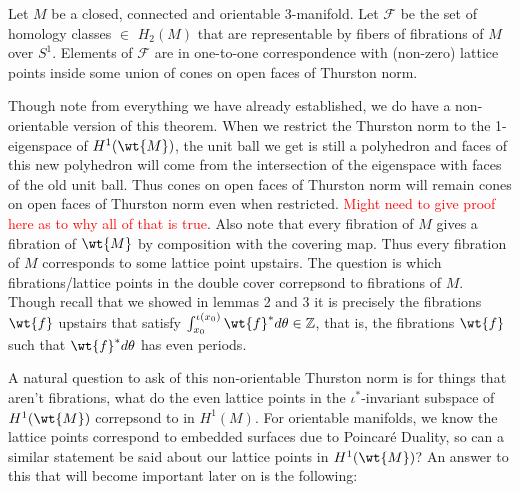 \begin{thm}[Thurston]
Let $M$ be a closed, connected and orientable 3-manifold. Let $\mathcal{F}$ be the set of homology classes $\in$ $H_2(M)$ that are representable by fibers of fibrations of $M$ over $S^1$. Elements of $\mathcal{F}$ are in one-to-one correspondence with (non-zero) lattice points inside some union of cones on open faces of Thurston norm.
\end{thm}

Though note from everything we have already established, we do have a non-orientable version of this theorem. When we restrict the Thurston norm to the 1-eigenspace of $H^1(\wt{M})$, the unit ball we get is still a polyhedron and faces of this new polyhedron will come from the intersection of the eigenspace with faces of the old unit ball. Thus cones on open faces of Thurston norm will remain cones on open faces of Thurston norm even when restricted. \textcolor{red}{Might need to give proof here as to why all of that is true}. Also note that every fibration of $M$ gives a fibration of $\wt{M}$ by composition with the covering map. Thus every fibration of $M$ corresponds to some lattice point upstairs. The question is which fibrations/lattice points in the double cover correpsond to fibrations of $M$. Though recall that we showed in lemmas 2 and 3 it is precisely the fibrations $\wt{f}$ upstairs that satisfy $\int_{x_0}^{\iota(x_0)} \wt{f}^*d\theta \in \mathbb{Z}$, that is, the fibrations $\wt{f}$ such that $\wt{f}^*d\theta$ has even periods. 

A natural question to ask of this non-orientable Thurston norm is for things that aren't fibrations, what do the even lattice points in the $\iota^*$-invariant subspace of $H^1(\wt{M})$ correpsond to in $H^1(M)$. For orientable manifolds, we know the lattice points correspond to embedded surfaces due to Poincar\'e Duality, so can a similar statement be said about our lattice points in $H^1(\wt{M})$? An answer to this that will become important later on is the following:

